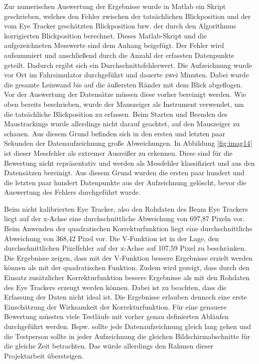 Zur numerischen Auswertung der Ergebnisse wurde in Matlab ein Skript geschrieben, welches den Fehler zwischen der tatsächlichen Blickposition und der vom Eye Tracker geschätzten Blickposition bzw. der durch den Algorithmus korrigierten Blickposition berechnet. Dieses Matlab-Skript und die aufgezeichneten Messwerte sind dem Anhang beigefügt. Der Fehler wird aufsummiert und anschließend durch die Anzahl der erfassten Datenpunkte geteilt. Dadurch ergibt sich ein Durchschnittsfehlerwert. Die Aufzeichnung wurde vor Ort im Fahrsimulator durchgeführt und dauerte zwei Minuten. Dabei wurde die gesamte Leinwand bis auf die äußersten Ränder mit dem Blick abgeflogen. Vor der Auswertung der Datensätze müssen diese vorher bereinigt werden. Wie oben bereits beschrieben, wurde der Mauszeiger als Instrument verwendet, um die tatsächliche Blickposition zu erfassen. Beim Starten und Beenden des Maustrackings wurde allerdings nicht darauf geachtet, auf den Mauszeiger zu schauen. Aus diesem Grund befinden sich in den ersten und letzten paar Sekunden der Datenaufzeichnung große Abweichungen. In Abbildung \ref{fig:imag14} ist dieser Messfehler als extremer Ausreißer zu erkennen. Diese sind für die Bewertung nicht repräsentativ und werden als Messfehler klassifiziert und aus den Datensätzen bereinigt. Aus diesem Grund wurden die ersten paar hundert und die letzten paar hundert Datenpunkte aus der Aufzeichnung gelöscht, bevor die Auswertung des Fehlers durchgeführt wurde. 

Beim nicht kalibrierten Eye Tracker, also den Rohdaten des Beam Eye Trackers liegt auf der x-Achse eine durchschnittliche Abweichung von 697,87 Pixeln vor. 
Beim Anwenden der quadratischen Korrekturfunktion liegt eine durchschnittliche Abweichung von 368,42 Pixel vor. Die V-Funktion ist in der Lage, den durchschnittlichen Pixelfehler auf der x-Achse auf 107,59 Pixel zu beschränken. 
Die Ergebnisse zeigen, dass mit der V-Funktion bessere Ergebnisse erzielt werden können als mit der quadratischen Funktion. Zudem wird gezeigt, dass durch den Einsatz zusätzlicher Korrekturfunktion bessere Ergebnisse als mit den Rohdaten des Eye Trackers erzeugt werden können. Dabei ist zu beachten, dass die Erfassung der Daten nicht ideal ist. Die Ergebnisse erlauben dennoch eine erste Einschätzung der Wirksamkeit der Korrekturfunktion. Für eine genauere Bewertung müssten viele Testläufe mit vorher genau definierten Abläufen durchgeführt werden. Bspw. sollte jede Datenaufzeichnung gleich lang gehen und die Testperson sollte in jeder Aufzeichnung die gleichen Bildschirmabschnitte für die gleiche Zeit betrachten. Das würde allerdings den Rahmen dieser Projektarbeit übersteigen. 


